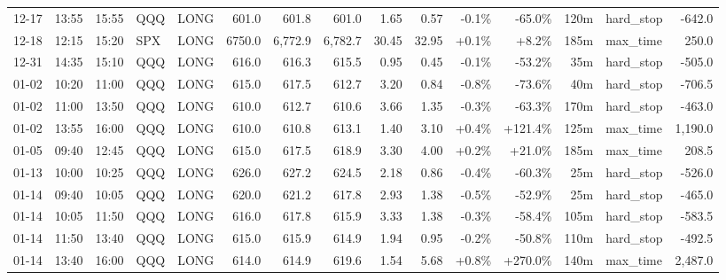 \documentclass[11pt,a4paper,twoside]{article}
\begin{document}
\begin{landscape}
\begin{center}
\begin{longtable}{>{\color{txtmain}}l l l l l r r r r r r r r >{\color{txtmain}}l r}
12-17 & 13:55 & 15:55 & QQQ & LONG & 601.0 & 601.8 & 601.0 & 1.65 & 0.57 & \textcolor{lossred}{-0.1\%} & \textcolor{lossred}{-65.0\%} & 120m & hard\_stop & \textcolor{lossred}{-642.0} \\
12-18 & 12:15 & 15:20 & SPX & LONG & 6750.0 & 6,772.9 & 6,782.7 & 30.45 & 32.95 & \textcolor{wingreen}{+0.1\%} & \textcolor{wingreen}{+8.2\%} & 185m & max\_time & \textcolor{wingreen}{250.0} \\
12-31 & 14:35 & 15:10 & QQQ & LONG & 616.0 & 616.3 & 615.5 & 0.95 & 0.45 & \textcolor{lossred}{-0.1\%} & \textcolor{lossred}{-53.2\%} & 35m & hard\_stop & \textcolor{lossred}{-505.0} \\
01-02 & 10:20 & 11:00 & QQQ & LONG & 615.0 & 617.5 & 612.7 & 3.20 & 0.84 & \textcolor{lossred}{-0.8\%} & \textcolor{lossred}{-73.6\%} & 40m & hard\_stop & \textcolor{lossred}{-706.5} \\
01-02 & 11:00 & 13:50 & QQQ & LONG & 610.0 & 612.7 & 610.6 & 3.66 & 1.35 & \textcolor{lossred}{-0.3\%} & \textcolor{lossred}{-63.3\%} & 170m & hard\_stop & \textcolor{lossred}{-463.0} \\
01-02 & 13:55 & 16:00 & QQQ & LONG & 610.0 & 610.8 & 613.1 & 1.40 & 3.10 & \textcolor{wingreen}{+0.4\%} & \textcolor{wingreen}{+121.4\%} & 125m & max\_time & \textcolor{wingreen}{1,190.0} \\
01-05 & 09:40 & 12:45 & QQQ & LONG & 615.0 & 617.5 & 618.9 & 3.30 & 4.00 & \textcolor{wingreen}{+0.2\%} & \textcolor{wingreen}{+21.0\%} & 185m & max\_time & \textcolor{wingreen}{208.5} \\
01-13 & 10:00 & 10:25 & QQQ & LONG & 626.0 & 627.2 & 624.5 & 2.18 & 0.86 & \textcolor{lossred}{-0.4\%} & \textcolor{lossred}{-60.3\%} & 25m & hard\_stop & \textcolor{lossred}{-526.0} \\
01-14 & 09:40 & 10:05 & QQQ & LONG & 620.0 & 621.2 & 617.8 & 2.93 & 1.38 & \textcolor{lossred}{-0.5\%} & \textcolor{lossred}{-52.9\%} & 25m & hard\_stop & \textcolor{lossred}{-465.0} \\
01-14 & 10:05 & 11:50 & QQQ & LONG & 616.0 & 617.8 & 615.9 & 3.33 & 1.38 & \textcolor{lossred}{-0.3\%} & \textcolor{lossred}{-58.4\%} & 105m & hard\_stop & \textcolor{lossred}{-583.5} \\
01-14 & 11:50 & 13:40 & QQQ & LONG & 615.0 & 615.9 & 614.9 & 1.94 & 0.95 & \textcolor{lossred}{-0.2\%} & \textcolor{lossred}{-50.8\%} & 110m & hard\_stop & \textcolor{lossred}{-492.5} \\
01-14 & 13:40 & 16:00 & QQQ & LONG & 614.0 & 614.9 & 619.6 & 1.54 & 5.68 & \textcolor{wingreen}{+0.8\%} & \textcolor{wingreen}{+270.0\%} & 140m & max\_time & \textcolor{wingreen}{2,487.0} \\

\end{longtable}
\end{center}
\end{landscape}
\end{document}
